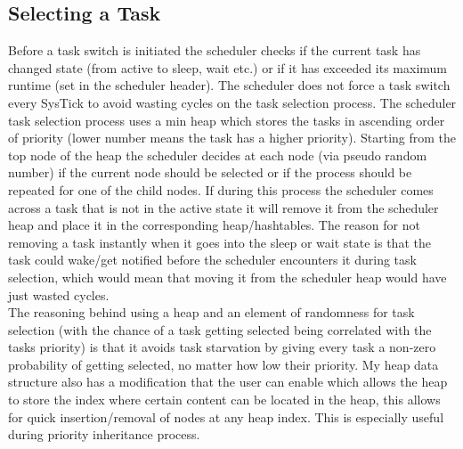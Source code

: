\documentclass[12pt,a4paper]{article}
\begin{document}



\subsection{Selecting a Task}
Before a task switch is initiated the scheduler checks if the current task has changed state (from active to sleep, wait etc.) or if it has exceeded its maximum runtime (set in the scheduler header). The scheduler does not force a task switch every SysTick to avoid wasting cycles on the task selection process. The scheduler task selection process uses a min heap which stores the tasks in ascending order of priority (lower number means the task has a higher priority). Starting from the top node of the heap the scheduler decides at each node (via pseudo random number) if the current node should be selected or if the process should be repeated for one of the child nodes. If during this process the scheduler comes across a task that is not in the active state it will remove it from the scheduler heap and place it in the corresponding heap/hashtables. The reason for not removing a task instantly when it goes into the sleep or wait state is that the task could wake/get notified before the scheduler encounters it during task selection, which would mean that moving it from the scheduler heap would have just wasted cycles.\\

The reasoning behind using a heap and an element of randomness for task selection (with the chance of a task getting selected being correlated with the tasks priority) is that it avoids task starvation by giving every task a non-zero probability of getting selected, no matter how low their priority. My heap data structure also has a modification that the user can enable which allows the heap to store the index where certain content can be located in the heap, this allows for quick insertion/removal of nodes at any heap index. This is especially useful during priority inheritance process. 




%
\end{document}
